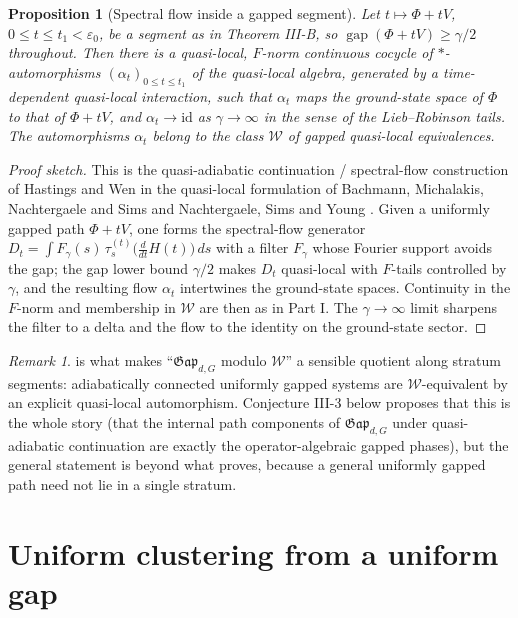 \documentclass[12pt]{article}
\newcommand{\Ffun}{F}                          %
\newcommand{\Gap}{\mathfrak{Gap}}              %
\newcommand{\Weq}{\mathcal{W}}                 %
\newcommand{\gapof}[1]{\operatorname{gap}(#1)} %
\theoremstyle{plain}
\newtheorem{proposition}[proposition]{Proposition}
\theoremstyle{definition}
\theoremstyle{remark}
\newtheorem{remark}[remark]{Remark}
\begin{document}
\begin{proposition}[Spectral flow inside a gapped segment]
\label{prop:flow}
Let $t\mapsto\Phi+tV$, $0\le t\le t_1<\varepsilon_0$, be a segment as in Theorem III-B,
so $\gapof{\Phi+tV}\ge\gamma/2$ throughout. Then there is a quasi-local, $\Ffun$-norm
continuous cocycle of $*$-automorphisms $(\alpha_{t})_{0\le t\le t_1}$ of the
quasi-local algebra, generated by a time-dependent quasi-local interaction, such that
$\alpha_t$ maps the ground-state space of $\Phi$ to that of $\Phi+tV$, and
$\alpha_t\to\mathrm{id}$ as $\gamma\to\infty$ in the sense of the Lieb--Robinson
tails. The automorphisms $\alpha_t$ belong to the class $\Weq$ of gapped quasi-local
equivalences.
\end{proposition}

\begin{proof}[Proof sketch]
This is the quasi-adiabatic continuation / spectral-flow construction of Hastings and
Wen \cite{hastings-wen-qac} in the quasi-local formulation of Bachmann, Michalakis,
Nachtergaele and Sims \cite{bmns-automorphic} and Nachtergaele, Sims and Young
\cite{nsy-quasilocality-2}. Given a uniformly gapped path $\Phi+tV$, one forms the
spectral-flow generator $D_t=\int F_\gamma(s)\,\tau^{(t)}_s\!\big(\tfrac{d}{dt}H(t)\big)\,ds$
with a filter $F_\gamma$ whose Fourier support avoids the gap; the gap lower bound
$\gamma/2$ makes $D_t$ quasi-local with $\Ffun$-tails controlled by $\gamma$, and the
resulting flow $\alpha_t$ intertwines the ground-state spaces. Continuity in the
$\Ffun$-norm and membership in $\Weq$ are then as in Part I\@. The $\gamma\to\infty$
limit sharpens the filter to a delta and the flow to the identity on the ground-state
sector.
\end{proof}

\begin{remark}
\label{rem:flow-W}
 is what makes ``$\Gap_{d,G}$ modulo $\Weq$'' a sensible quotient
along stratum segments: adiabatically connected uniformly gapped systems are
$\Weq$-equivalent by an explicit quasi-local automorphism. Conjecture III-3 below
proposes that this is the whole story (that the internal path components of
$\Gap_{d,G}$ under quasi-adiabatic continuation are exactly the operator-algebraic
gapped phases), but the general statement is beyond what  proves,
because a general uniformly gapped path need not lie in a single stratum.
\end{remark}

\section{Uniform clustering from a uniform gap}
\label{sec:clustering}
\end{document}
